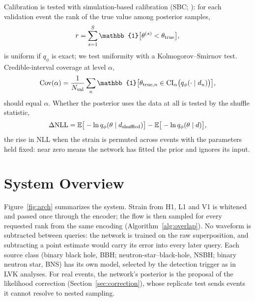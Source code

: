 \documentclass[twocolumn,linenumbers]{aastex701}
\begin{document}
Calibration is tested with simulation-based calibration (SBC;
\citealt{Talts2018Sbc}): for each validation event the rank of the true value
among posterior samples,
\begin{equation}
r = \sum_{s=1}^{S} \mathbb{1}\big[\theta^{(s)} < \theta_{\rm true}\big],
\label{eq:sbcrank}
\end{equation}
is uniform if $q_\phi$ is exact; we test uniformity with a Kolmogorov--Smirnov
test. Credible-interval coverage at level $\alpha$,
\begin{equation}
\mathrm{Cov}(\alpha) = \frac{1}{N_{\rm val}}\sum_{n} \mathbb{1}\big[\theta_{{\rm true},n} \in \mathrm{CI}_\alpha\big(q_\phi(\cdot\mid d_n)\big)\big],
\label{eq:coverage}
\end{equation}
should equal $\alpha$. Whether the posterior uses the data at all is tested by
the shuffle statistic,
\begin{equation}
\Delta\mathrm{NLL} = \mathbb{E}\big[-\ln q_\phi(\theta \mid d_{\rm shuffled})\big] - \mathbb{E}\big[-\ln q_\phi(\theta \mid d)\big],
\label{eq:shuffle}
\end{equation}
the rise in NLL when the strain is permuted across events with the parameters
held fixed: near zero means the network has fitted the prior and ignores its
input.

\section{System Overview} \label{sec:overview}

Figure~\ref{fig:arch} summarizes the system. Strain from H1, L1 and V1 is
whitened and passed once through the encoder; the flow is then sampled for
every requested rank from the same encoding (Algorithm~\ref{alg:overlap}). No
waveform is subtracted between queries: the network is trained on the raw
superposition, and subtracting a point estimate would carry its error into
every later query. Each source class (binary black hole, BBH; neutron-star--black-hole,
NSBH; binary neutron star, BNS) has its own model, selected by the detection
trigger as in LVK analyses. For real events, the network's posterior is the
proposal of the likelihood correction (Section~\ref{sec:correction}), whose
replicate test sends events it cannot resolve to nested sampling.
\end{document}
